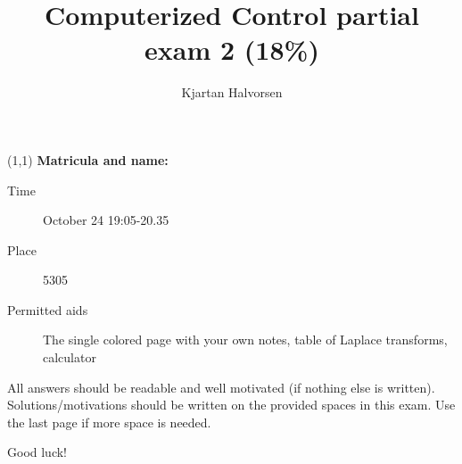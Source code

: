 \documentclass[letterpaper,12pt]{scrartcl}
\title{Computerized Control partial exam 2 (18\%)}
\author{Kjartan Halvorsen}
\date{}
\begin{document}
\begin{textblock}{5}(1,1)
\noindent\large\bf Matricula and name:
\end{textblock}


{\let\newpage\relax\maketitle}


\begin{description}
\item[Time] October 24 19:05-20.35
\item[Place] 5305
\item[Permitted aids] The single colored page with your own notes, table of Laplace transforms, calculator
\end{description}

All answers should be readable and well motivated (if nothing else is written). Solutions/motivations should be written on the provided spaces in this exam. Use the last page if more space is needed.

\begin{center}
{\Large Good luck!} \\
\end{center}




\end{document}
